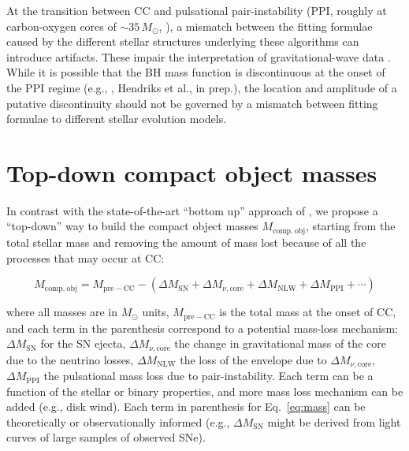 \documentclass[twocolumn]{aastex63}
\DeclareRobustCommand{\Eqref}[1]{Eq.~\ref{#1}}
\newcommand{\todo}[1]{{\large $\blacksquare$~\textbf{\color{red}[#1]}}~$\blacksquare$}
\begin{document}
At the transition between CC and pulsational
pair-instability (PPI, roughly at carbon-oxygen cores of
$\sim{}35\,M_\odot$, \citealt{woosley:17, marchant:19, renzo:20csm,
  costa:21}), a mismatch between the fitting formulae caused by the
different stellar structures underlying these algorithms can introduce
artifacts. These impair the interpretation of gravitational-wave data
\citep[see, e.g., the corresponding feature in Fig.~5
of][]{vanson:21}. While it is possible that the BH mass function is
discontinuous at the onset of the PPI regime (e.g.,
\citealt{renzo:20conv,costa:21}, Hendriks et al., in prep.), the
location and amplitude of a putative discontinuity should not be
governed by a mismatch between fitting formulae to different stellar
evolution models.

\section{Top-down compact object masses}

In contrast with the state-of-the-art  ``bottom up'' approach of
\cite{fryer:12}, we propose a ``top-down'' way to build the compact object masses
$M_\mathrm{comp.\ obj}$, starting from the total stellar mass and
removing the amount of mass lost because of all the processes that may
occur at CC:


\begin{widetext}
  \begin{equation}
    \label{eq:mass}
    M_\mathrm{comp.\ obj} = M_\mathrm{pre-CC} - \left(\Delta M_\mathrm{SN} + \Delta M_{\nu, \mathrm{core}} + \Delta M_\mathrm{NLW} + \Delta M_\mathrm{PPI} + \cdots \right)
  \end{equation}
\end{widetext}

where all masses are in $M_\odot$ units, $M_\mathrm{pre-CC}$ is the
total mass at the onset of CC, and each term in the
parenthesis correspond to a potential mass-loss mechanism:
$\Delta M_\mathrm{SN}$ for the SN ejecta,
$\Delta M_{\nu, \mathrm{core}}$ the change in gravitational mass of
the core due to the neutrino losses, $\Delta M_\mathrm{NLW}$ the
\cite{nadezhin:80, lovegrove:13} loss of the envelope due to
$\Delta M_{\nu, \mathrm{core}}$, $\Delta M_\mathrm{PPI}$ the
pulsational mass loss due to pair-instability. Each term can be a
function of the stellar or binary properties, and more mass loss
mechanism can be added (e.g., disk wind). Each term in parenthesis for
\Eqref{eq:mass} can be theoretically or observationally informed
(e.g., $\Delta M_\mathrm{SN}$ might be derived from light curves of
large samples of observed SNe).
\end{document}
